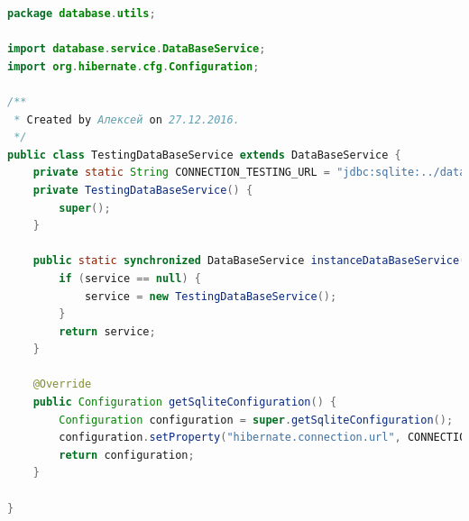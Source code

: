 \documentclass[a4paper,12pt]{article}
\begin{document}
\begin{lstlisting}[language=java, caption=код модуля TestingDataBaseService.java]
package database.utils;

import database.service.DataBaseService;
import org.hibernate.cfg.Configuration;

/**
 * Created by Алексей on 27.12.2016.
 */
public class TestingDataBaseService extends DataBaseService {
    private static String CONNECTION_TESTING_URL = "jdbc:sqlite:../database/test.db";
    private TestingDataBaseService() {
        super();
    }

    public static synchronized DataBaseService instanceDataBaseService() {
        if (service == null) {
            service = new TestingDataBaseService();
        }
        return service;
    }

    @Override
    public Configuration getSqliteConfiguration() {
        Configuration configuration = super.getSqliteConfiguration();
        configuration.setProperty("hibernate.connection.url", CONNECTION_TESTING_URL);
        return configuration;
    }

}
\end{lstlisting}
\end{document}
